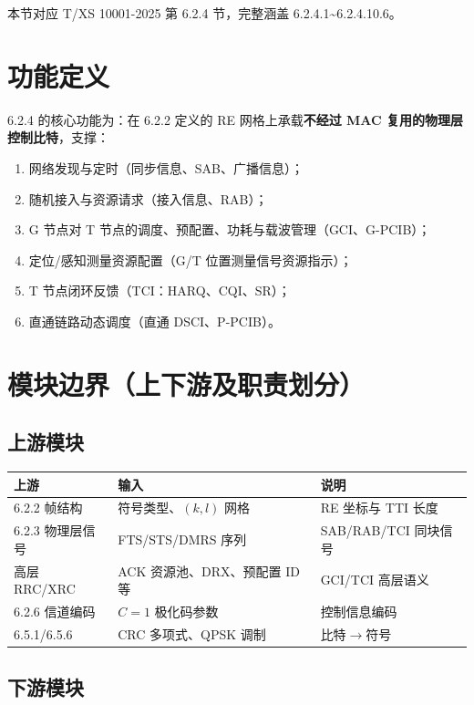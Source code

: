 \documentclass[11pt,a4paper]{ctexart}
\begin{document}
本节对应 T/XS 10001-2025 第 6.2.4 节，完整涵盖 6.2.4.1\textasciitilde 6.2.4.10.6。

\section{功能定义}

6.2.4 的核心功能为：在 6.2.2 定义的 RE 网格上承载\textbf{不经过 MAC 复用的物理层控制比特}，支撑：
\begin{enumerate}[nosep]
  \item 网络发现与定时（同步信息、SAB、广播信息）；
  \item 随机接入与资源请求（接入信息、RAB）；
  \item G 节点对 T 节点的调度、预配置、功耗与载波管理（GCI、G-PCIB）；
  \item 定位/感知测量资源配置（G/T 位置测量信号资源指示）；
  \item T 节点闭环反馈（TCI：HARQ、CQI、SR）；
  \item 直通链路动态调度（直通 DSCI、P-PCIB）。
\end{enumerate}

\section{模块边界（上下游及职责划分）}

\subsection{上游模块}

\begin{table}[h]
\centering
\small
\begin{tabular}{p{4cm}p{4.5cm}p{5.5cm}}
\toprule
\textbf{上游} & \textbf{输入} & \textbf{说明} \\
\midrule
6.2.2 帧结构 & 符号类型、$(k,l)$ 网格 & RE 坐标与 TTI 长度 \\
6.2.3 物理层信号 & FTS/STS/DMRS 序列 & SAB/RAB/TCI 同块信号 \\
高层 RRC/XRC & ACK 资源池、DRX、预配置 ID 等 & GCI/TCI 高层语义 \\
6.2.6 信道编码 & $C=1$ 极化码参数 & 控制信息编码 \\
6.5.1/6.5.6 & CRC 多项式、QPSK 调制 & 比特$\rightarrow$符号 \\
\bottomrule
\end{tabular}
\end{table}

\subsection{下游模块}
\end{document}
